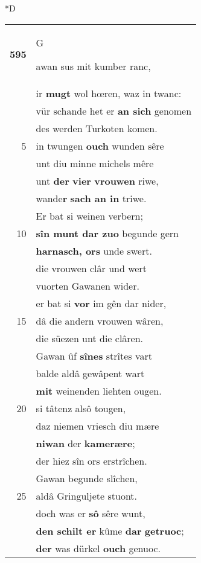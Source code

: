 \documentclass[8pt,a4paper,notitlepage]{article}
\begin{document}
\begin{table}[ht]
\begin{minipage}[t]{0.5\linewidth}
\small
\begin{center}*D
\end{center}
\begin{tabular}{rl}
\textbf{595} & \begin{large}G\end{large}awan sus mit kumber ranc,\\ 
 & ir \textbf{mugt} wol hœren, waz in twanc:\\ 
 & vür schande het er \textbf{an sich} genomen\\ 
 & des werden Turkoten komen.\\ 
5 & in twungen \textbf{ouch} wunden sêre\\ 
 & unt diu minne michels mêre\\ 
 & unt \textbf{der} \textbf{vier} \textbf{vrouwen} riwe,\\ 
 & wande\textbf{r} \textbf{sach an in} triwe.\\ 
 & Er bat si weinen verbern;\\ 
10 & \textbf{sîn munt dar zuo} begunde gern\\ 
 & \textbf{harnasch, ors} unde swert.\\ 
 & die vrouwen clâr und wert\\ 
 & vuorten Gawanen wider.\\ 
 & er bat si \textbf{vor} im gên dar nider,\\ 
15 & dâ die andern vrouwen wâren,\\ 
 & die süezen unt die clâren.\\ 
 & Gawan ûf \textbf{sînes} strîtes vart\\ 
 & balde aldâ gewâpent wart\\ 
 & \textbf{mit} weinenden liehten ougen.\\ 
20 & si tâtenz alsô tougen,\\ 
 & daz niemen vriesch diu mære\\ 
 & \textbf{niwan} der \textbf{kamerære};\\ 
 & der hiez sîn ors erstrîchen.\\ 
 & Gawan begunde slîchen,\\ 
25 & aldâ Gringuljete stuont.\\ 
 & doch was er \textbf{sô} sêre wunt,\\ 
 & \textbf{den schilt er} kûme \textbf{dar} \textbf{getruoc};\\ 
 & \textbf{der} was dürkel \textbf{ouch} genuoc.\\ 

\end{tabular}
\end{minipage}
\end{table}
\end{document}
